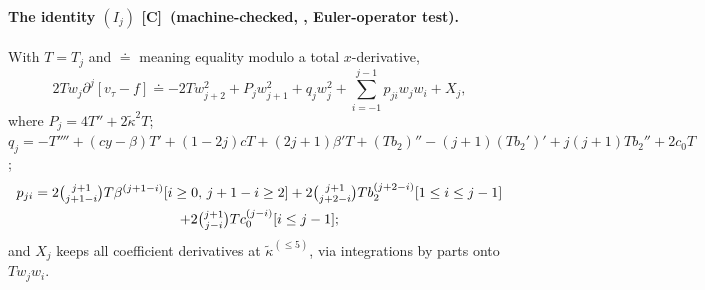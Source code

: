 \documentclass[11pt]{article}
\theoremstyle{definition}
\theoremstyle{remark}
\newcommand{\fn}[1]{\texttt{\detokenize{#1}}}
\newcommand{\tC}{\textnormal{\textsc{[C]}}}
\newcommand{\kt}{\tilde\kappa}
\begin{document}
\paragraph{The identity $(I_j)$ \tC\ (machine-checked, \fn{lfsym.py}, Euler-operator test).} With $T=T_j$ and $\doteq$ meaning equality modulo a total $x$-derivative,
\[
2Tw_j\partial^j[v_\tau-f]\doteq-2Tw_{j+2}^2+P_jw_{j+1}^2+q_jw_j^2+\sum_{i=-1}^{j-1}p_{ji}w_jw_i+X_j,
\]
where $P_j=4T''+2\kt^2T$; $q_j=-T''''+(cy-\beta)T'+(1-2j)cT+(2j+1)\beta'T+(Tb_2)''-(j+1)(Tb_2')'+j(j+1)Tb_2''+2c_0T$;
\begin{multline*}
p_{ji}=2\tbinom{j+1}{j+1-i}T\beta^{(j+1-i)}[i\ge0,\,j+1-i\ge2]+2\tbinom{j+1}{j+2-i}Tb_2^{(j+2-i)}[1\le i\le j-1]\\
+2\tbinom{j+1}{j-i}Tc_0^{(j-i)}[i\le j-1];
\end{multline*}
and $X_j$ keeps all coefficient derivatives at $\kt^{(\le5)}$, via integrations by parts onto $Tw_jw_i$.
\end{document}
